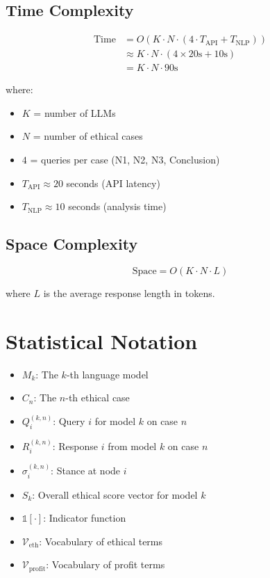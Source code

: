 \documentclass[11pt]{article}
\begin{document}
\subsection*{Time Complexity}

\begin{align}
\text{Time} &= O(K \cdot N \cdot (4 \cdot T_{\text{API}} + T_{\text{NLP}})) \\
&\approx K \cdot N \cdot (4 \times 20\text{s} + 10\text{s}) \\
&= K \cdot N \cdot 90\text{s}
\end{align}

where:
\begin{itemize}[noitemsep]
    \item $K$ = number of LLMs
    \item $N$ = number of ethical cases
    \item $4$ = queries per case (N1, N2, N3, Conclusion)
    \item $T_{\text{API}} \approx 20$ seconds (API latency)
    \item $T_{\text{NLP}} \approx 10$ seconds (analysis time)
\end{itemize}

\subsection*{Space Complexity}

\begin{equation}
\text{Space} = O(K \cdot N \cdot L)
\end{equation}

where $L$ is the average response length in tokens.

\section*{Statistical Notation}

\begin{itemize}[noitemsep]
    \item $M_k$: The $k$-th language model
    \item $C_n$: The $n$-th ethical case
    \item $Q_i^{(k,n)}$: Query $i$ for model $k$ on case $n$
    \item $R_i^{(k,n)}$: Response $i$ from model $k$ on case $n$
    \item $\sigma_i^{(k,n)}$: Stance at node $i$
    \item $S_k$: Overall ethical score vector for model $k$
    \item $\mathbb{1}[\cdot]$: Indicator function
    \item $\mathcal{V}_{\text{eth}}$: Vocabulary of ethical terms
    \item $\mathcal{V}_{\text{profit}}$: Vocabulary of profit terms
\end{itemize}
\end{document}
